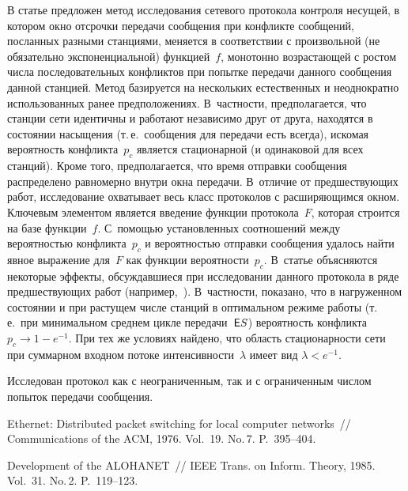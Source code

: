 \begin{multicols}{2}
В статье предложен метод исследования сетевого протокола контроля
несущей,  в котором окно отсрочки передачи сообщения при конфликте
сообщений, посланных разными станциями, меняется  в соответствии с
произвольной (не обязательно экспоненциальной) функцией~$f$,
монотонно возрастающей с ростом числа последовательных конфликтов
при попытке передачи данного сообщения данной станцией. Метод
базируется на нескольких естественных и неоднократно использованных
ранее предположениях. В~частности, предполагается, что станции сети
идентичны и работают независимо друг от друга, находятся в состоянии
насыщения (т.\,е.\ сообщения  для  передачи есть всегда), искомая
вероятность конфликта~$p_c$ является стационарной (и одинаковой для
всех станций). %
Кроме того, предполагается, что время отправки
сообщения распределено равномерно внутри \mbox{окна} передачи.
 В~отличие от предшествующих работ, исследование охватывает весь  класс протоколов с рас\-ши\-ря\-ющим\-ся
окном. Ключевым элементом    является введение функции протокола~$F$, 
которая строится на базе функции~$f$. 
%
С~помощью установленных
соотношений между веро\-ят\-ностью конфликта~$p_c$  и ве\-ро\-ят\-ностью
отправки сообщения удалось \mbox{найти} явное  выражение для~$F$ как функции
ве\-ро\-ят\-ности~$p_c$. 
%
В~статье объясняются некоторые эффекты,
обсуждавшиеся  при исследовании данного протокола в ряде
предшествующих работ (например,~\cite{SHOCH}). В~частности,
показано, что в нагруженном состоянии и при растущем числе станций в
оптимальном режиме работы (т.\,е.\ при минимальном среднем цикле
передачи~${\sf E} S$) вероятность конфликта $p_c\to 1-e^{-1}$. При тех же
условиях найдено, что область стационарности сети при суммарном
входном потоке интенсивности~$\lambda$ имеет вид $\lambda<e^{-1}$.
{

}

Исследован протокол как с неограниченным, так и с ограниченным
числом попыток передачи сообщения.

\vspace*{-12pt}

{\small\frenchspacing
{\baselineskip=12pt
\begin{thebibliography}{99}

  Ethernet: Distributed packet switching for local computer
networks~// Communications of the ACM, 1976. Vol.~19. No.\,7. P.~395--404.

  Development of the ALOHANET~//
  IEEE Trans. on Inform. Theory, 1985. Vol.~31. No.\,2. P.~119--123.


\end{thebibliography}}}
\end{multicols}

